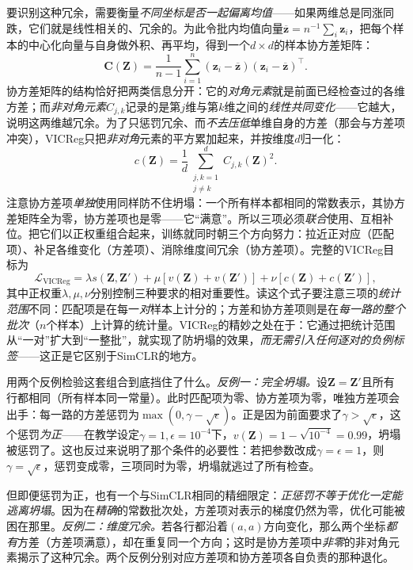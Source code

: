 要识别这种冗余，需要衡量\emph{不同坐标是否一起偏离均值}——如果两维总是同涨同跌，它们就是线性相关的、冗余的。为此令批内均值向量$\overline{\bm{z}}=n^{-1}\sum_i\bm{z}_i$，把每个样本的中心化向量与自身做外积、再平均，得到一个$d\times d$的样本协方差矩阵：
\[
  \bm{C}(\bm{Z})
  =\frac{1}{n-1}\sum_{i=1}^{n}
  (\bm{z}_i-\overline{\bm{z}})
  (\bm{z}_i-\overline{\bm{z}})^{\top}.
\]
协方差矩阵的结构恰好把两类信息分开：它的\emph{对角元素}就是前面已经检查过的各维方差；而\emph{非对角元素}$C_{j,k}$记录的是第$j$维与第$k$维之间的\emph{线性共同变化}——它越大，说明这两维越冗余。为了只惩罚冗余、而\emph{不去压低}单维自身的方差（那会与方差项冲突），VICReg只把\emph{非对角}元素的平方累加起来，并按维度$d$归一化：
\begin{equation}
  c(\bm{Z})
  =\frac{1}{d}\sum_{\substack{j,k=1\\j\neq k}}^{d}C_{j,k}(\bm{Z})^2.
  \label{eq:data-derived-knowledge-vicreg-covariance}
\end{equation}
注意协方差项\emph{单独}使用同样防不住坍塌：一个所有样本都相同的常数表示，其协方差矩阵全为零，协方差项也是零——它“满意”。所以三项必须\emph{联合}使用、互相补位。把它们以正权重组合起来，训练就同时朝三个方向努力：拉近正对应（匹配项）、补足各维变化（方差项）、消除维度间冗余（协方差项）。完整的VICReg目标为
\begin{equation}
  \mathcal{L}_{\mathrm{VICReg}}
  =\lambda s(\bm{Z},\bm{Z}')
  +\mu\!\left[v(\bm{Z})+v(\bm{Z}')\right]
  +\nu\!\left[c(\bm{Z})+c(\bm{Z}')\right],
  \label{eq:data-derived-knowledge-vicreg}
\end{equation}
其中正权重$\lambda,\mu,\nu$分别控制三种要求的相对重要性。读这个式子要注意三项的\emph{统计范围}不同：匹配项是在每一\emph{对}样本上计分的；方差和协方差项则是在\emph{每一路的整个批次}（$n$个样本）上计算的统计量。VICReg的精妙之处在于：它通过把统计范围从“一对”扩大到“一整批”，就实现了防坍塌的效果，\emph{而无需引入任何逐对的负例标签}——这正是它区别于SimCLR的地方。

用两个反例检验这套组合到底挡住了什么。\emph{反例一：完全坍塌。}设$\bm{Z}=\bm{Z}'$且所有行都相同（所有样本同一常量）。此时匹配项为零、协方差项为零，唯独方差项会出手：每一路的方差惩罚为$\max(0,\gamma-\sqrt{\epsilon})$。正是因为前面要求了$\gamma>\sqrt{\epsilon}$，这个惩罚\emph{为正}——在教学设定$\gamma=1,\epsilon=10^{-4}$下，$v(\bm{Z})=1-\sqrt{10^{-4}}=0.99$，坍塌被惩罚了。这也反过来说明了那个条件的必要性：若把参数改成$\gamma=\epsilon=1$，则$\gamma=\sqrt{\epsilon}$，惩罚变成零，三项同时为零，坍塌就逃过了所有检查。

但即便惩罚为正，也有一个与SimCLR相同的精细限定：\emph{正惩罚不等于优化一定能逃离坍塌}。因为在\emph{精确}的常数批次处，方差项对表示的梯度仍然为零，优化可能被困在那里。\emph{反例二：维度冗余。}若各行都沿着$(a,a)$方向变化，那么两个坐标\emph{都有}方差（方差项满意），却在重复同一个方向；这时是协方差项中\emph{非零}的非对角元素揭示了这种冗余。两个反例分别对应方差项和协方差项各自负责的那种退化。

